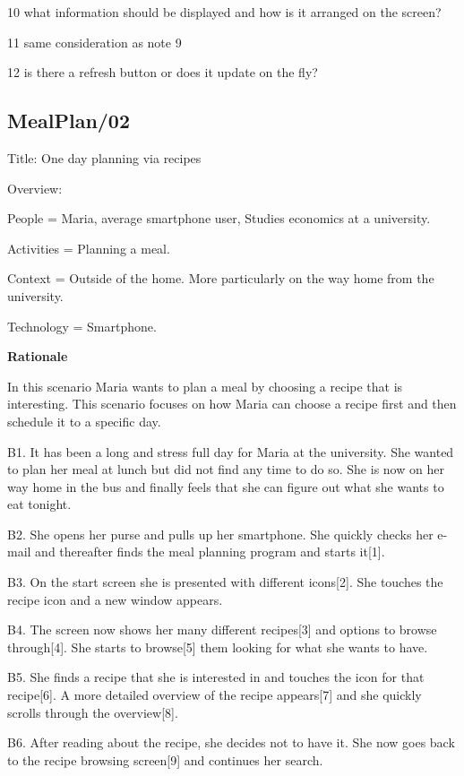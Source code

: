 10 what information should be displayed and how is it arranged on the screen?

11 same consideration as note 9

12 is there a refresh button or does it update on the fly?

\subsection{MealPlan/02} \label{MealPlan02}

Title: One day planning via recipes

Overview:

	People = Maria, average smartphone user, Studies economics at a university. 
	
	Activities = Planning a meal.

	Context = Outside of the home. More particularly on the way home from the university.

	Technology = Smartphone.

\textbf{Rationale}

In this scenario Maria wants to plan a meal by choosing a recipe that is interesting. This scenario focuses on how Maria can choose a recipe first and then schedule it to a specific day.

	B1. It has been a long and stress full day for Maria at the university. She wanted to plan her meal at lunch but did not find any time to do so. She is now on her way home in the bus and finally feels that she can figure out what she wants to eat tonight.

	B2. She opens her purse and pulls up her smartphone. She quickly checks her e-mail and thereafter finds the meal planning program and starts it[1]. 

	B3. On the start screen she is presented with different icons[2]. She touches the recipe icon and a new window appears.

	B4. The screen now shows her many different recipes[3] and options to browse through[4]. She starts to browse[5] them looking for what she wants to have. 

	B5. She finds a recipe that she is interested in and touches the icon for that recipe[6]. A more detailed overview of the recipe appears[7] and she quickly scrolls through the overview[8].

	B6. After reading about the recipe, she decides not to have it. She now goes back to the recipe browsing screen[9] and continues her search.

